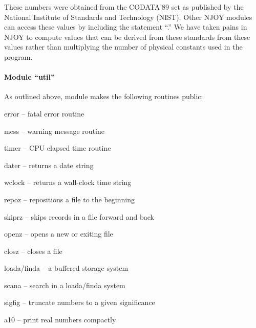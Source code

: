\noindent
These numbers were obtained from the CODATA'89 set as published by
the National Institute of Standards and Technology (NIST).  Other
NJOY modules can access these values by including the statement
``.''  We have taken pains in NJOY to compute
values that can be derived from these standards from these values
rather than multiplying the number of physical constants used in the
program.

\paragraph{Module ``util''}

As outlined above, module  makes the following routines
public:

\begin{description}
\begin{singlespace}
\item[error --] fatal error routine

\item[mess --] warning message routine

\item[timer --] CPU elapsed time routine

\item[dater --] returns a date string

\item[wclock --] returns a wall-clock time string

\item[repoz --] repositions a file to the beginning

\item[skiprz --] skips records in a file forward and back

\item[openz --] opens a new or exiting file

\item[closz --] closes a file

\item[loada/finda --] a buffered storage system

\item[scana --] search in a loada/finda system

\item[sigfig --] truncate numbers to a given significance

\item[a10 --] print real numbers compactly
\end{singlespace}
\end{description}


